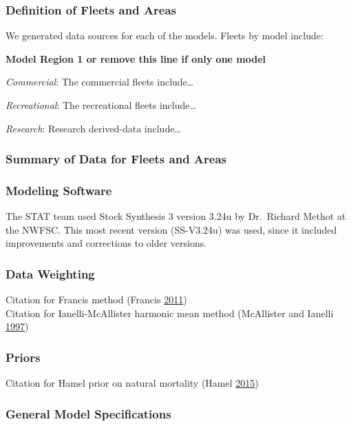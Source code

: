 \documentclass[12pt,]{article}
\begin{document}
\subsubsection{Definition of Fleets and
Areas}\label{definition-of-fleets-and-areas}

We generated data sources for each of the models. Fleets by model
include:

\textbf{Model Region 1 or remove this line if only one model}

\emph{Commercial}: The commercial fleets include\ldots{}

\emph{Recreational}: The recreational fleets include\ldots{}

\emph{Research}: Research derived-data include\ldots{}

\subsubsection{Summary of Data for Fleets and
Areas}\label{summary-of-data-for-fleets-and-areas}

\subsubsection{Modeling Software}\label{modeling-software}

The STAT team used Stock Synthesis 3 version 3.24u by Dr.~Richard Methot
at the NWFSC. This most recent version (SS-V3.24u) was used, since it
included improvements and corrections to older versions.

\subsubsection{Data Weighting}\label{data-weighting}

Citation for Francis method (Francis
\protect\hyperlink{ref-Francis2011}{2011})\\
Citation for Ianelli-McAllister harmonic mean method (McAllister and
Ianelli \protect\hyperlink{ref-McAllister1997}{1997})

\subsubsection{Priors}\label{priors}

Citation for Hamel prior on natural mortality (Hamel
\protect\hyperlink{ref-Hamel2015}{2015})

\subsubsection{General Model
Specifications}\label{general-model-specifications}
\end{document}
